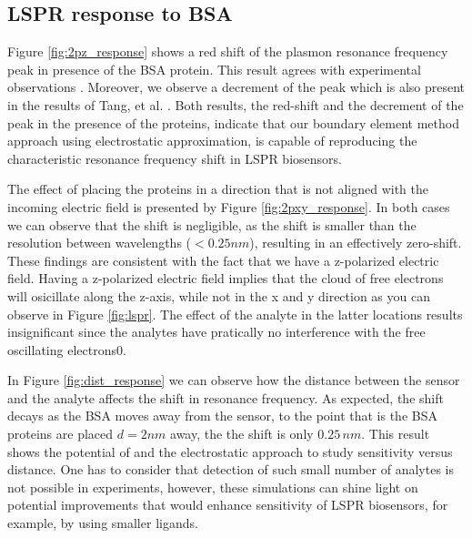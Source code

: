 \subsection{LSPR response to BSA}

Figure \ref{fig:2pz_response} shows a red shift of the plasmon resonance frequency peak in presence of the BSA protein.
This result agrees with experimental observations
\cite{TangETal2010, RaphaelETal2013}. Moreover, we observe a decrement of 
the peak which is also present in the results of Tang, et al. \cite{TangETal2010}.
Both results, the red-shift and the decrement of the peak in the presence of 
the proteins, indicate that our boundary element method approach using electrostatic
approximation, is capable of reproducing the characteristic resonance frequency 
shift in LSPR biosensors.

The effect of placing the proteins in a direction that is not aligned with the incoming electric field
is presented by Figure \ref{fig:2pxy_response}. In both cases we can observe that the shift is negligible, 
as the shift is smaller than the resolution between wavelengths ($< 0.25 nm$), resulting in an
effectively zero-shift. These findings are consistent with 
the fact that we have a z-polarized electric field. Having a z-polarized electric
field implies that the cloud of free electrons will osicillate along the z-axis, while 
not in the x and y direction as you can observe in Figure \ref{fig:lspr}. The
effect of the analyte in the latter locations results insignificant since the 
analytes have pratically no interference with the free oscillating electrons0. 

In Figure \ref{fig:dist_response} we can observe how the distance between the sensor 
and the analyte affects the shift in resonance frequency. As expected, the shift decays 
as the BSA moves away from the sensor, to the point that is the BSA proteins are placed
$d=2 nm$ away, the the shift is only $0.25 \, nm$. This result shows the potential of \pygbe 
and the electrostatic approach to study sensitivity versus distance.
One has to consider that detection of such
small number of analytes is not possible in experiments, however, these simulations can shine light on
potential improvements that would enhance sensitivity of LSPR biosensors, for example, by using
smaller ligands. 



